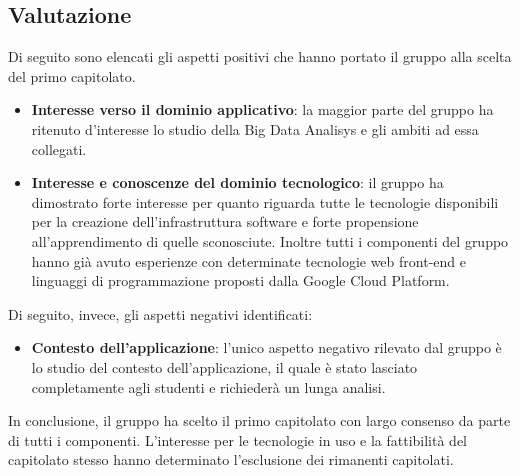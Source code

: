 \subsection{Valutazione}
Di seguito sono elencati gli aspetti positivi che hanno portato il gruppo alla scelta del primo capitolato.
\begin{itemize}
    \item \textbf{Interesse verso il dominio applicativo}: la maggior parte del gruppo ha ritenuto d'interesse lo studio della Big Data Analisys e gli ambiti ad essa collegati.
    \item \textbf{Interesse e conoscenze del dominio tecnologico}: il gruppo ha dimostrato forte interesse per quanto riguarda tutte le tecnologie disponibili per la creazione dell'infrastruttura software e forte propensione all'apprendimento di quelle sconosciute. Inoltre tutti i componenti del gruppo hanno già avuto esperienze con determinate tecnologie web front-end e linguaggi di programmazione proposti dalla Google Cloud Platform.
\end{itemize}
Di seguito, invece, gli aspetti negativi identificati:
\begin{itemize}
    \item \textbf{Contesto dell'applicazione}: l'unico aspetto negativo rilevato dal gruppo è lo studio del contesto dell'applicazione, il quale è stato lasciato completamente agli studenti e richiederà un lunga analisi.
\end{itemize}
In conclusione, il gruppo ha scelto il primo capitolato con largo consenso da parte di tutti i componenti. L'interesse per le tecnologie in uso e la fattibilità del capitolato stesso hanno determinato l'esclusione dei rimanenti capitolati.
